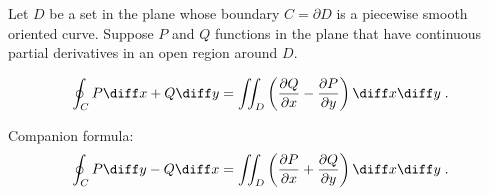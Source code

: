\begin{frame}
\frametitle{\color{green}{Green's Theorem}}
Let $D$ be a set in the plane whose boundary $C=\partial D$ is a piecewise smooth oriented curve. Suppose $P$ and $Q$ functions in the plane that have continuous partial derivatives in an open region around $D$.
\begin{theorem}[Green]
\[\oint_C P \diff x + Q \diff y = \iint_D \left( \frac{ \partial Q}{\partial x} - \frac{ \partial P}{ \partial y} \right) \diff x \diff y \; .
\]
\end{theorem}

Companion formula:
\[
\oint_C P\diff y - Q\diff x = \iint_D \left(\frac{\partial P}{ \partial x} + \frac{ \partial Q}{\partial y} \right) \diff x \diff y \; .
\]
\end{frame}